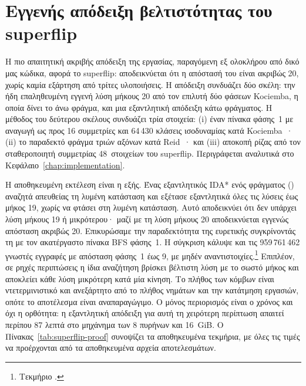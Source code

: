 \section{Εγγενής απόδειξη βελτιστότητας του superflip}
\label{sec:experiments-superflip}

Η πιο απαιτητική ακριβής απόδειξη της εργασίας, παραγόμενη εξ ολοκλήρου από δικό μας κώδικα, αφορά το superflip: αποδεικνύεται ότι η απόστασή του είναι ακριβώς 20, χωρίς καμία εξάρτηση από τρίτες υλοποιήσεις. Η απόδειξη συνδυάζει δύο σκέλη: την ήδη επαληθευμένη εγγενή λύση μήκους 20 από τον επιλυτή δύο φάσεων Kociemba, η οποία δίνει το άνω φράγμα, και μια εξαντλητική απόδειξη κάτω φράγματος. Η μέθοδος του δεύτερου σκέλους συνδυάζει τρία στοιχεία: (i) έναν πίνακα φάσης~1  με αναγωγή ως προς 16 συμμετρίες και 64\,430 κλάσεις ισοδυναμίας κατά Kociemba~\cite{kociembaImplementationDetails}· (ii) το παραδεκτό φράγμα τριών αξόνων κατά Reid~\cite{reid1997optimal}· και (iii) αποκοπή ρίζας από τον σταθεροποιητή συμμετρίας 48~στοιχείων του superflip. Περιγράφεται αναλυτικά στο Κεφάλαιο~\ref{chap:implementation}.

Η αποθηκευμένη εκτέλεση είναι η εξής. Ένας εξαντλητικός IDA* ενός φράγματος () αναζητά απευθείας τη λυμένη κατάσταση και εξέτασε εξαντλητικά όλες τις λύσεις έως μήκος 19, χωρίς να φτάσει στη λυμένη κατάσταση. Αυτό αποδεικνύει ότι δεν υπάρχει λύση μήκους 19 ή μικρότερου· μαζί με τη λύση μήκους 20 αποδεικνύεται εγγενώς απόσταση ακριβώς 20. Επικυρώσαμε την παραδεκτότητα της ευρετικής συγκρίνοντάς τη  με τον ακατέργαστο πίνακα BFS φάσης~1. Η σύγκριση κάλυψε και τις 959\,761\,462 γνωστές εγγραφές με απόσταση φάσης~1 έως 9, με μηδέν αναντιστοιχίες.\footnote{Τεκμήριο .} Επιπλέον, σε ρηχές περιπτώσεις η ίδια αναζήτηση βρίσκει βέλτιστη λύση με το σωστό μήκος και αποκλείει κάθε λύση μικρότερη κατά μία κίνηση. Το πλήθος των κόμβων είναι ντετερμινιστικό και ανεξάρτητο από το πλήθος νημάτων και την κατάτμηση εργασιών, οπότε το αποτέλεσμα είναι αναπαραγώγιμο. Ο μόνος περιορισμός είναι ο χρόνος και όχι η ορθότητα: η εξαντλητική απόδειξη για αυτή τη χειρότερη περίπτωση απαιτεί περίπου 87 λεπτά στο μηχάνημα των 8 πυρήνων και 16~GiB. Ο Πίνακας~\ref{tab:superflip-proof} συνοψίζει τα αποθηκευμένα τεκμήρια, με όλες τις τιμές να προέρχονται από τα αποθηκευμένα αρχεία αποτελεσμάτων.

\begin{table}[htbp]\centering

\caption[Τεκμήρια της εγγενούς απόδειξης κάτω φράγματος του superflip]{Αποθηκευμένα τεκμήρια της εγγενούς εξαντλητικής απόδειξης κάτω φράγματος για το superflip: παραμετροποίηση της αναζήτησης, ντετερμινιστικά πλήθη κόμβων και αποτέλεσμα αποκλεισμού κάθε λύσης μήκους έως 19. Πηγή: τεκμήρια της εκτέλεσης .}
\label{tab:superflip-proof}
\end{table}

